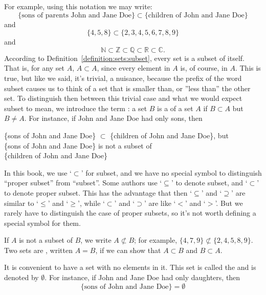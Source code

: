 For example, using this notation we may write:
\[
\{\text{sons of parents John and Jane Doe}\} \subset \{\text{children of John and Jane Doe\}}
\]
and 
\[
\{4,5,8\} \subset \{2, 3, 4, 5, 6, 7, 8, 9 \}
\]
and
\[
{\mathbb N} \subset {\mathbb Z} \subset {\mathbb Q} \subset {\mathbb R} \subset {\mathbb C}.
\]
According to Definition~\ref{definition:sets:subset}, every set is a subset of itself.  That is, for any set $A$, $A \subset A$, since every element in $A$ is, of course, in $A$.  This is true, but like we said, it's trivial, a nuisance, because the prefix of the word subset causes us to think of a set that is smaller than, or ''less than'' the other set.  To distinguish then between this trivial case and what we would expect subset to mean, we introduce the term :  a set $B$ is a  of a set $A$ if $B \subset A$ but $B \neq A$. For instance, if John and Jane Doe had only sons, then
\begin{center}
\{sons of John and Jane Doe\} $\subset$ \{children of John and Jane Doe\}, but \\
\bigskip
\{sons of John and Jane Doe\} is not a  subset of  \\ 
\medskip{}
\{children of John and Jane Doe\} \\
\end{center}

\begin{rem} 
In this book, we use `$\subset$' for subset, and we have no special symbol to distinguish ``proper subset'' from ``subset''.
Some authors use  `$\subseteq$' to denote  subset, and  `$\subset$' to denote proper subset. This has the advantage that then `$\subseteq$' and `$\supseteq$' are similar to `$\le$' and `$\ge$', while `$\subset$' and `$\supset$' are like `$<$' and `$>$'.
But we rarely have to distinguish the case of proper subsets, so it's not worth defining a special symbol for them.
\end{rem}

If $A$ is not a subset of $B$, we write $A \not \subset B$; for example, $\{4, 7, 9\} \not \subset \{2, 4, 5,  8, 9 \}$.  Two sets are , written $A = B$, if we can show that $A \subset B$ and $B \subset A$.  

It is convenient to have a set with no elements in it.  This set is called the  and is denoted by $\emptyset$\label{theemptyset}.  For instance, if John and Jane Doe had only daughters, then
\[
\mbox{\{sons of John and Jane Doe\}} = \emptyset
\]

